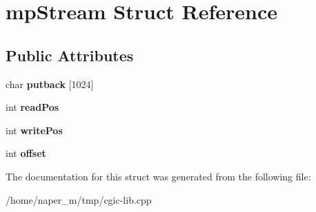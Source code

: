 \hypertarget{structmp_stream}{\section{mp\-Stream Struct Reference}
\label{structmp_stream}
}
\subsection*{Public Attributes}
\begin{DoxyCompactItemize}
\item 
\hypertarget{structmp_stream_a7c37685961e74b30a9dd05b480d490d5}{char {\bfseries putback} \mbox{[}1024\mbox{]}}\label{structmp_stream_a7c37685961e74b30a9dd05b480d490d5}

\item 
\hypertarget{structmp_stream_ab69bda513ac4554f8fb392813efd8a1c}{int {\bfseries read\-Pos}}\label{structmp_stream_ab69bda513ac4554f8fb392813efd8a1c}

\item 
\hypertarget{structmp_stream_a895abe74b0c94ea79862b17af5abfcb5}{int {\bfseries write\-Pos}}\label{structmp_stream_a895abe74b0c94ea79862b17af5abfcb5}

\item 
\hypertarget{structmp_stream_a12d057ac8b5b547d14667aef239e97c0}{int {\bfseries offset}}\label{structmp_stream_a12d057ac8b5b547d14667aef239e97c0}

\end{DoxyCompactItemize}


The documentation for this struct was generated from the following file\-:\begin{DoxyCompactItemize}
\item 
/home/naper\-\_\-m/tmp/cgic-\/lib.\-cpp\end{DoxyCompactItemize}

